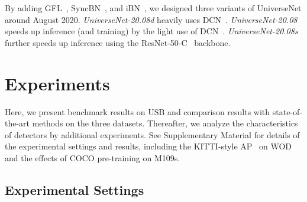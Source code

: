 \documentclass[10pt,twocolumn,letterpaper]{article}
\newcommand{\OurOrig}{UniverseNet\xspace}
\newcommand{\OurAugustD}{UniverseNet-20.08d\xspace}
\newcommand{\OurAugust}{UniverseNet-20.08\xspace}
\newcommand{\OurAugustS}{UniverseNet-20.08s\xspace}
\def\AppendixSection{Supplementary Material\xspace}
\newcommand{\MangasAbbr}{M109s\xspace}
\begin{document}
By adding GFL~\cite{GFL_NeurIPS2020}, SyncBN~\cite{MegDet_CVPR2018}, and iBN~\cite{SEPC_CVPR2020},
we designed three variants of \OurOrig
around August 2020.
\textit{\OurAugustD} heavily uses DCN~\cite{DCN_ICCV2017}.
\textit{\OurAugust} speeds up inference (and training) by the light use of DCN~\cite{DCN_ICCV2017, SEPC_CVPR2020}.
\textit{\OurAugustS} further speeds up inference using the ResNet-50-C~\cite{BagOfTricks_Classification_CVPR2019} backbone.







\section{Experiments}

Here, we present benchmark results on USB
and comparison results with state-of-the-art methods on the three datasets.
Thereafter, we analyze the characteristics of detectors by additional experiments.
See \AppendixSection for details of the experimental settings and results,
including the KITTI-style AP~\cite{KITTI_CVPR2012, WaymoOpenDataset_CVPR2020} on WOD
and the effects of COCO pre-training on \MangasAbbr.


\subsection{Experimental Settings} \label{sec:experimental_settings}
\end{document}
